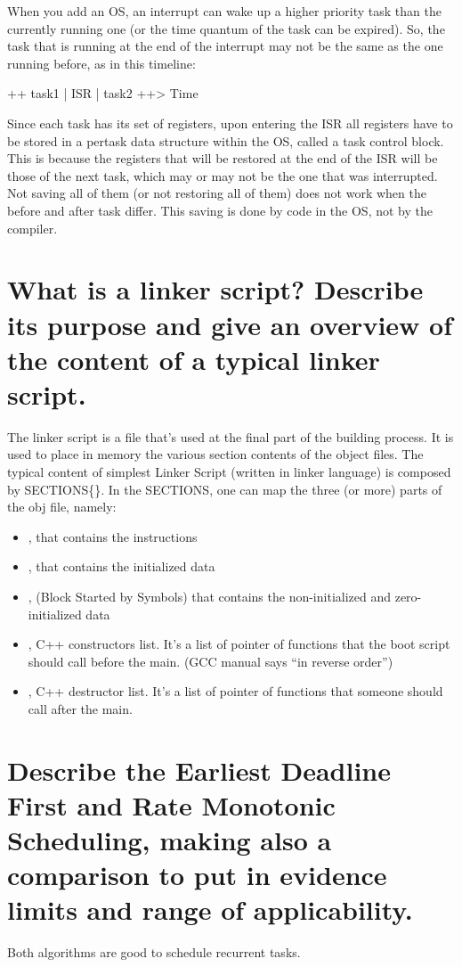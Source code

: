When you add an OS, an interrupt can wake up a higher priority task than the currently running one (or the time quantum of the task can be expired). So, the task that is running at the end of the interrupt may not be the same as the one running before, as in this timeline: 


++ task1 | ISR | task2 ++> Time


Since each task has its set of registers, upon entering the ISR all registers have to be stored in a per­task data structure within the OS, called a task control block. This is because the registers that will be restored at the end of the ISR will be those of the next task, which may or may not be the one that was interrupted. Not saving all of them (or not restoring all of them) does not work when the before and after task differ. This saving is done by code in the OS, not by the compiler.

\section{What is a linker script? Describe its purpose and give an overview of the content of a typical linker script.}
The linker script is a file that's used at the final part of the building process. It is used to place in memory the various section contents of the object files. 
The typical content of simplest Linker Script (written in linker language) is composed by SECTIONS\{\}.
In the SECTIONS, one can map the three (or more) parts of the obj file, namely:
\begin{itemize}
	\item {}, that contains the instructions
	\item {}, that contains the initialized data
	\item {}, (Block Started by Symbols) that contains the non-initialized and zero-initialized data
    \item {}, C++ constructors list. It's a list of pointer of functions that the boot script should call before the main. (GCC manual says ``in reverse order'')
    \item {}, C++ destructor list. It's a list of pointer of functions that someone should call after the main.
\end{itemize}


\section{Describe the Earliest Deadline First and Rate Monotonic Scheduling, making also a comparison to put in evidence limits and range of applicability.}
\label{rmsedf}
Both algorithms are good to schedule recurrent tasks.

